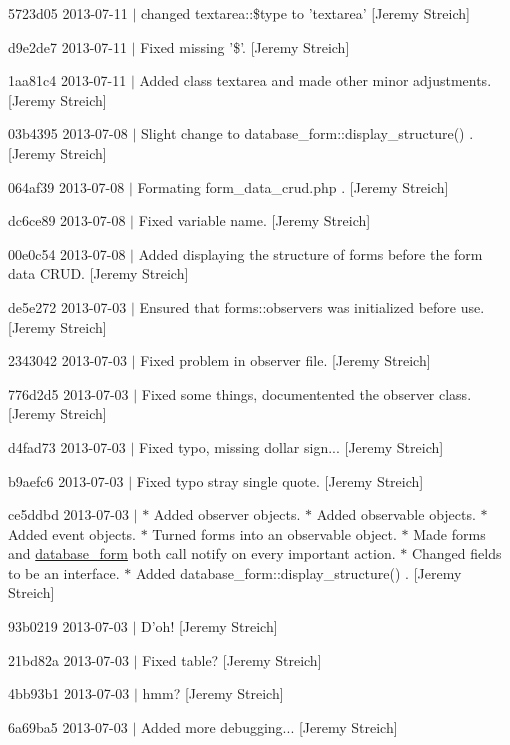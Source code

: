 \begin{DoxyItemize}
\item 5723d05 2013-\/07-\/11 $|$ changed textarea\-::\$type to 'textarea' \mbox{[}Jeremy Streich\mbox{]}
\item d9e2de7 2013-\/07-\/11 $|$ Fixed missing '\$'. \mbox{[}Jeremy Streich\mbox{]}
\item 1aa81c4 2013-\/07-\/11 $|$ Added class textarea and made other minor adjustments. \mbox{[}Jeremy Streich\mbox{]}
\item 03b4395 2013-\/07-\/08 $|$ Slight change to database\-\_\-form\-::display\-\_\-structure() . \mbox{[}Jeremy Streich\mbox{]}
\item 064af39 2013-\/07-\/08 $|$ Formating form\-\_\-data\-\_\-crud.\-php . \mbox{[}Jeremy Streich\mbox{]}
\item dc6ce89 2013-\/07-\/08 $|$ Fixed variable name. \mbox{[}Jeremy Streich\mbox{]}
\item 00e0c54 2013-\/07-\/08 $|$ Added displaying the structure of forms before the form data C\-R\-U\-D. \mbox{[}Jeremy Streich\mbox{]}
\item de5e272 2013-\/07-\/03 $|$ Ensured that forms\-::observers was initialized before use. \mbox{[}Jeremy Streich\mbox{]}
\item 2343042 2013-\/07-\/03 $|$ Fixed problem in observer file. \mbox{[}Jeremy Streich\mbox{]}
\item 776d2d5 2013-\/07-\/03 $|$ Fixed some things, documentented the observer class. \mbox{[}Jeremy Streich\mbox{]}
\item d4fad73 2013-\/07-\/03 $|$ Fixed typo, missing dollar sign... \mbox{[}Jeremy Streich\mbox{]}
\item b9aefc6 2013-\/07-\/03 $|$ Fixed typo stray single quote. \mbox{[}Jeremy Streich\mbox{]}
\item ce5ddbd 2013-\/07-\/03 $|$ $\ast$ Added observer objects. $\ast$ Added observable objects. $\ast$ Added event objects. $\ast$ Turned forms into an observable object. $\ast$ Made forms and \hyperlink{classdatabase__form}{database\-\_\-form} both call notify on every important action. $\ast$ Changed fields to be an interface. $\ast$ Added database\-\_\-form\-::display\-\_\-structure() . \mbox{[}Jeremy Streich\mbox{]}
\item 93b0219 2013-\/07-\/03 $|$ D'oh! \mbox{[}Jeremy Streich\mbox{]}
\item 21bd82a 2013-\/07-\/03 $|$ Fixed table? \mbox{[}Jeremy Streich\mbox{]}
\item 4bb93b1 2013-\/07-\/03 $|$ hmm? \mbox{[}Jeremy Streich\mbox{]}
\item 6a69ba5 2013-\/07-\/03 $|$ Added more debugging... \mbox{[}Jeremy Streich\mbox{]}

\end{DoxyItemize}
